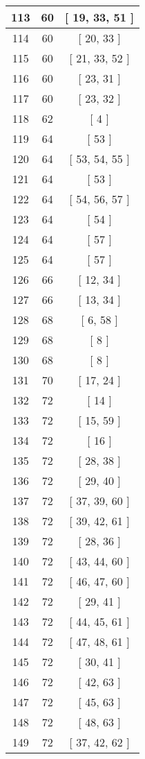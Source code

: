 \begin{center}
\begin{longtable}[H]{|| c c c ||}
113 & 60 & [ 19, 33, 51 ]
\\\hline
114 & 60 & [ 20, 33 ]
\\\hline
115 & 60 & [ 21, 33, 52 ]
\\\hline
116 & 60 & [ 23, 31 ]
\\\hline
117 & 60 & [ 23, 32 ]
\\\hline
118 & 62 & [ 4 ]
\\\hline
119 & 64 & [ 53 ]
\\\hline
120 & 64 & [ 53, 54, 55 ]
\\\hline
121 & 64 & [ 53 ]
\\\hline
122 & 64 & [ 54, 56, 57 ]
\\\hline
123 & 64 & [ 54 ]
\\\hline
124 & 64 & [ 57 ]
\\\hline
125 & 64 & [ 57 ]
\\\hline
126 & 66 & [ 12, 34 ]
\\\hline
127 & 66 & [ 13, 34 ]
\\\hline
128 & 68 & [ 6, 58 ]
\\\hline
129 & 68 & [ 8 ]
\\\hline
130 & 68 & [ 8 ]
\\\hline
131 & 70 & [ 17, 24 ]
\\\hline
132 & 72 & [ 14 ]
\\\hline
133 & 72 & [ 15, 59 ]
\\\hline
134 & 72 & [ 16 ]
\\\hline
135 & 72 & [ 28, 38 ]
\\\hline
136 & 72 & [ 29, 40 ]
\\\hline
137 & 72 & [ 37, 39, 60 ]
\\\hline
138 & 72 & [ 39, 42, 61 ]
\\\hline
139 & 72 & [ 28, 36 ]
\\\hline
140 & 72 & [ 43, 44, 60 ]
\\\hline
141 & 72 & [ 46, 47, 60 ]
\\\hline
142 & 72 & [ 29, 41 ]
\\\hline
143 & 72 & [ 44, 45, 61 ]
\\\hline
144 & 72 & [ 47, 48, 61 ]
\\\hline
145 & 72 & [ 30, 41 ]
\\\hline
146 & 72 & [ 42, 63 ]
\\\hline
147 & 72 & [ 45, 63 ]
\\\hline
148 & 72 & [ 48, 63 ]
\\\hline
149 & 72 & [ 37, 42, 62 ]
\\\hline

\end{longtable}
\end{center}
